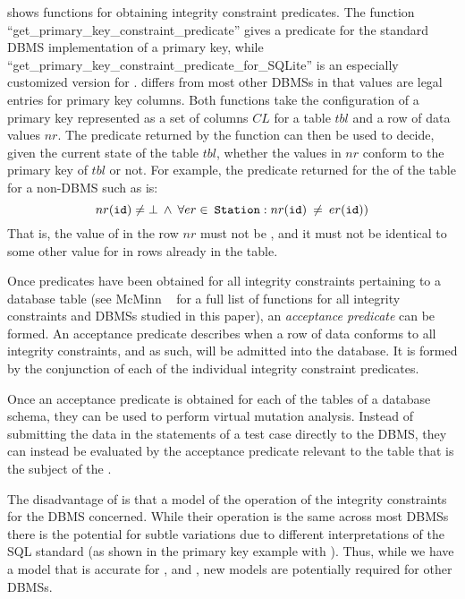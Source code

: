 \begin{sloppypar}
 shows functions for obtaining integrity constraint predicates. The function
``get\_primary\_key\_constraint\_predicate'' gives a predicate for the standard DBMS implementation of a primary key,
while ``get\_primary\_key\_constraint\_predicate\_for\_SQLite'' is an especially customized version for \SQLite. \SQLite
differs from most other DBMSs in that \NULL values are legal entries for primary key columns. Both functions take the
configuration of a primary key represented as a set of columns $CL$ for a table $tbl$ and a row of data values $nr$. The
predicate returned by the function can then be used to decide, given the current state of the table $tbl$, whether the
values in $nr$ conform to the primary key of $tbl$ or not. For example, the predicate returned for the \PK of the
 table for a non-\SQLite DBMS such as \Postgres is: \[nr ({\normalfont{\texttt{id}}}) \neq \bot \: \wedge \:
\forall er \in \: {\normalfont{\texttt{Station}}}: nr ({\normalfont{\texttt{id}}}) \: \neq \: er ({\normalfont{\texttt{id}}}))\] That is, the value of  in the row $nr$ must not
be \NULL, and it must not be identical to some other value for  in rows already in the table.
\end{sloppypar}



Once predicates have been obtained for all integrity constraints pertaining to a database table (see McMinn \etal~\cite{McMinn2015} for a full list of functions for all integrity constraints and DBMSs studied in this paper), an {\it acceptance predicate} can be formed. An acceptance predicate describes when a row of data conforms to all integrity constraints, and as such, will be admitted into the database. It is formed by the conjunction of each of the individual integrity constraint predicates.



Once an acceptance predicate is obtained for each of the tables of a database schema, they can be used to perform virtual mutation analysis. Instead of submitting the data in the \INSERT statements of a test case directly to the DBMS, they can instead be evaluated by the acceptance predicate relevant to the table that is the subject of the \INSERT. 

The disadvantage of \VMA is that a model of the operation of the integrity constraints for the DBMS concerned. While their operation is the same across most DBMSs there is the potential for subtle variations due to different interpretations of the SQL standard (as shown in the primary key example with \SQLite). Thus, while we have a model that is accurate for \HyperSQL, \Postgres and \SQLite, new models are potentially required for other DBMSs. 

